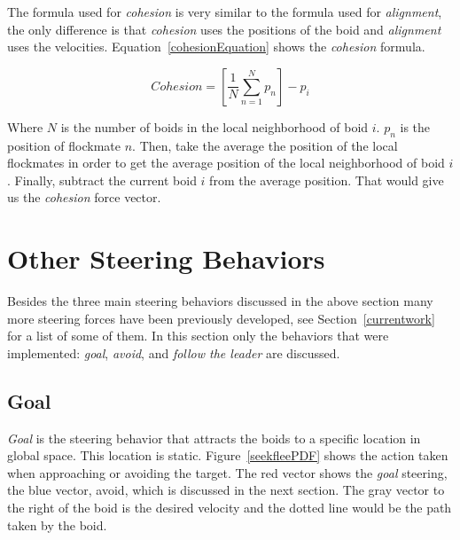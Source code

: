 The formula used for \textit{cohesion} is very similar to the formula used for \textit{alignment}, the only difference is that \textit{cohesion} uses the positions of the boid and \textit{alignment} uses the velocities. Equation~\ref{cohesionEquation} shows the \textit{cohesion} formula.

\begin{equation}
\label{cohesionEquation}
Cohesion = \left[  \frac{1}{N} \sum_{n=1}^{N} p_n \right ] - p_i
\end{equation}

Where $N$ is the number of boids in the local neighborhood of boid $i$. $p_n$ is the position of flockmate $n$. Then, take the average the position of the local flockmates in order to get the average position of the local neighborhood of boid $i$. Finally, subtract the current boid $i$ from the average position. That would give us the \textit{cohesion} force vector.

\section{Other Steering Behaviors}\label{otherbehaviors}
Besides the three main steering behaviors discussed in the above section many more steering forces have been previously developed, see Section~\ref{currentwork} for a list of some of them. In this section only the behaviors that were implemented: \textit{goal}, \textit{avoid}, and \textit{follow the leader} are discussed.

\subsection{Goal}
\textit{Goal} is the steering behavior that attracts the boids to a specific location in global space. This location is static. Figure~\ref{seekfleePDF} shows the action taken when approaching or avoiding the target. The red vector shows the \textit{goal} steering, the blue vector, avoid, which is discussed in the next section. The gray vector to the right of the boid is the desired velocity and the dotted line would be the path taken by the boid.

